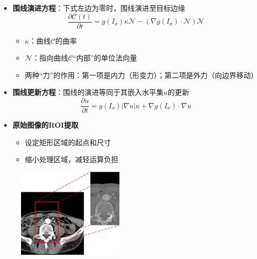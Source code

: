 \begin{frame}
\begin{itemize}
 \item \textbf{围线演进方程}：下式左边为零时，围线演进至目标边缘
\begin{equation*}
\label{eqn:EvolutionModel}
\frac{\partial \mathcal{C}(t)}{\partial t} = g(I_{\sigma}) \kappa \mathcal{N} - (\nabla g(I_{\sigma}) \cdot \mathcal{N}) \mathcal{N}
\end{equation*}
\begin{itemize}
\item $\kappa$：曲线$\mathcal{C}$的曲率
\item $\mathcal{N}$：指向曲线$\mathcal{C}$“内部”的单位法向量
\item 两种“力”的作用：第一项是内力（形变力）；第二项是外力（向边界移动）
\end{itemize}
 \item \textbf{围线更新方程}：围线的演进等同于其嵌入水平集$u$的更新
\begin{equation*}
\frac{\partial u}{\partial t} = g(I_{\sigma}) |\nabla u| \kappa + \nabla g(I_{\sigma}) \cdot \nabla u
\end{equation*}
\end{itemize}
\end{frame}

\begin{frame}
\begin{itemize}
\item \textbf{原始图像的ROI提取}
\begin{itemize}
\pause \item 设定矩形区域的起点和尺寸
\pause \item 缩小处理区域，减轻运算负担
\end{itemize}
\end{itemize}
\begin{figure}[t]
\centering
\includegraphics[width=2.0in]{../../Figures/gac/ROI.eps}
\end{figure}
\end{frame}

